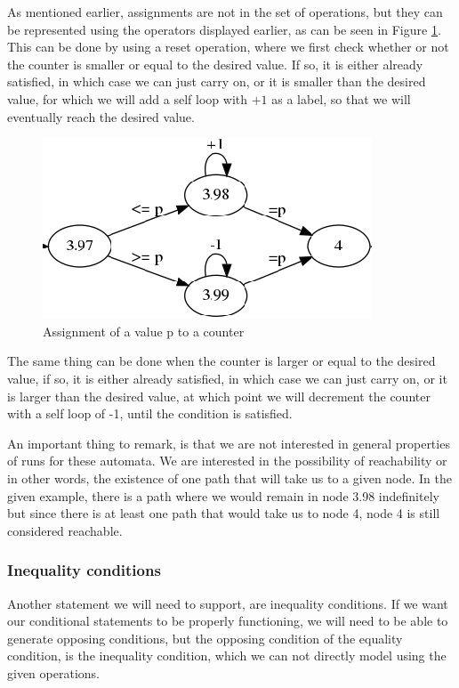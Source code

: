 \documentclass[12pt]{article}
\begin{document}
As mentioned earlier, assignments are not in the set of operations, but they can be represented using the operators displayed earlier, as can be seen in Figure \ref{fig:counter_assignment}. This can be done by using a reset operation, where we first check whether or not the counter is smaller or equal to the desired value. If so, it is either already satisfied, in which case we can just carry on, or it is smaller than the desired value, for which we will add a self loop with $+1$ as a label, so that we will eventually reach the desired value. 
\begin{figure}[h]
	\centering
	\includegraphics[width=0.48\linewidth]{counter_assignment}
	\caption{Assignment of a value p to a counter}
	\label{fig:counter_assignment}
\end{figure}

The same thing can be done when the counter is larger or equal to the desired value, if so, it is either already satisfied, in which case we can just carry on, or it is larger than the desired value, at which point we will decrement the counter with a self loop of -1, until the condition is satisfied.

An important thing to remark, is that we are not interested in general properties of runs for these automata. We are interested in the possibility of reachability or in other words, the existence of one path that will take us to a given node. In the given example, there is a path where we would remain in node 3.98 indefinitely but since there is at least one path that would take us to node 4, node 4 is still considered reachable.

\subsubsection{Inequality conditions}
\label{sec:inequality}
Another statement we will need to support, are inequality conditions. If we want our conditional statements to be properly functioning, we will need to be able to generate opposing conditions, but the opposing condition of the equality condition, is the inequality condition, which we can not directly model using the given operations.
\end{document}

